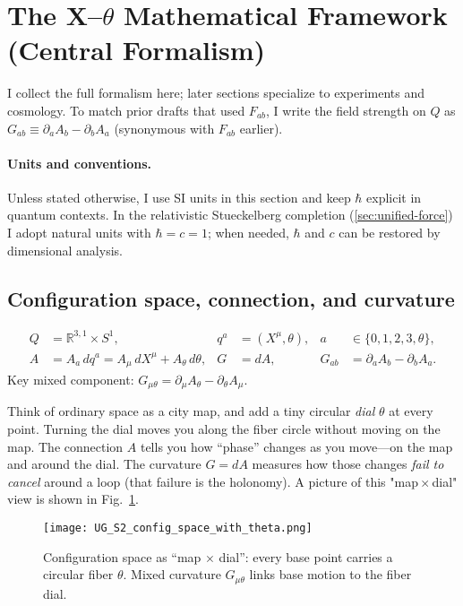 \section{The X--\texorpdfstring{$\theta$}{theta} Mathematical Framework (Central Formalism)}\label{sec:framework}

I collect the full formalism here; later sections specialize to experiments and cosmology. To match prior drafts that used $F_{ab}$, I write the field strength on $Q$ as $G_{ab}\equiv\partial_aA_b-\partial_bA_a$ (synonymous with $F_{ab}$ earlier).

\paragraph{Units and conventions.} Unless stated otherwise, I use SI units in this section and keep $\hbar$ explicit in quantum contexts. In the relativistic Stueckelberg completion (\cref{sec:unified-force}) I adopt natural units with $\hbar=c=1$; when needed, $\hbar$ and $c$ can be restored by dimensional analysis.

\subsection{Configuration space, connection, and curvature}\label{sec:config-connection-curvature}
\begin{align}
Q&=\mathbb{R}^{3,1}\times S^1, & q^a&=(X^\mu,\theta), & a&\in\{0,1,2,3,\theta\},\\
A&=A_a\,dq^a= A_\mu\,dX^\mu + A_\theta\,d\theta, & G&=dA, & G_{ab}&=\partial_aA_b-\partial_bA_a.
\end{align}
Key mixed component: $G_{\mu\theta}=\partial_\mu A_\theta-\partial_\theta A_\mu$.

\begin{idea}
Think of ordinary space as a city map, and add a tiny circular \emph{dial} $\theta$ at every point. Turning the dial moves you along the fiber circle without moving on the map. The connection $A$ tells you how “phase” changes as you move—on the map and around the dial. The curvature $G=dA$ measures how those changes \emph{fail to cancel} around a loop (that failure is the holonomy). A picture of this "map\,$\times$\,dial" view is shown in Fig.~\ref{fig:map-dial}.
\end{idea}

\begin{figure}[h]
  \centering
  \texttt{[image: UG\_S2\_config\_space\_with\_theta.png]}
  \caption{Configuration space as “map $\times$ dial”: every base point carries a circular fiber $\theta$. Mixed curvature $G_{\mu\theta}$ links base motion to the fiber dial.}
  \label{fig:map-dial}
\end{figure}

